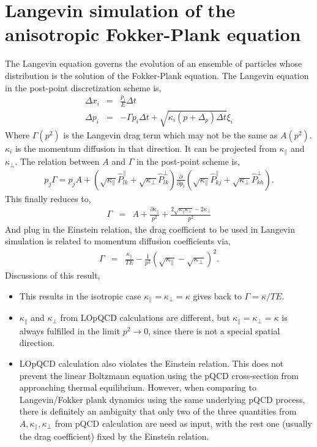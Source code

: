 \documentclass[10pt,a4paper]{article}
\newcommand{\ppl}{\frac{\partial}{\partial p_l}}
\newcommand{\Kpara}{\kappa_{\|}}
\newcommand{\Kperp}{\kappa_{\perp}}
\newcommand{\Ppara}{\hat{P}^{\|}}
\newcommand{\Pperp}{\hat{P}^{\perp}}
\begin{document}
\section{Langevin simulation of the anisotropic Fokker-Plank equation}
The Langevin equation governs the evolution of an ensemble of particles whose distribution is the solution of the Fokker-Plank equation.
The Langevin equation in the post-point discretization scheme is,
\begin{eqnarray}
\Delta x_i &=& \frac{p_i}{E} \Delta t	\\
\Delta p_i &=& -\Gamma p_i \Delta t + \sqrt{\kappa_i(p+\Delta_p)\Delta t} \xi_i
\end{eqnarray}
Where $\Gamma(p^2)$ is the Langevin drag term which may not be the same as $A(p^2)$. 
$\kappa_i$ is the momentum diffusion in that direction. 
It can be projected from $\Kpara$ and $\Kperp$.
The relation between $A$ and $\Gamma$ in the post-point scheme is,
\begin{eqnarray}
p_j \Gamma  = p_jA + \left(\sqrt{\Kpara}\Ppara_{lk} + \sqrt{\Kperp}\Pperp_{lk}\right) \ppl \left( \sqrt{\Kpara}\Ppara_{kj} + \sqrt{\Kperp}\Pperp_{kh} \right).
\end{eqnarray}
This finally reduces to,
\begin{eqnarray}
\Gamma &=& A + \frac{\partial \Kpara}{p^2} + \frac{2\sqrt{\Kpara\Kperp} - 2\Kperp}{p^2}
\end{eqnarray}
And plug in the Einstein relation, the drag coefficient to be used in Langevin simulation is related to momentum diffusion coefficients via,
\begin{eqnarray}
\Gamma &=& \frac{\Kpara}{TE} - \frac{1}{p^2}\left( \sqrt{\Kpara} - \sqrt{\Kperp} \right)^2.
\end{eqnarray}
Discussions of this result,
\begin{itemize}
\item This results in the isotropic case $\Kpara=\Kperp=\kappa$ gives back to $\Gamma = \kappa/TE$.
\item $\Kpara$ and $\Kperp$ from LOpQCD calculations are different, but $\Kpara=\Kperp=\kappa$ is always fulfilled in the limit $p^2 \rightarrow 0$, since there is not a special spatial direction.
\item LOpQCD calculation also violates the Einstein relation. 
This does not prevent the linear Boltzmann equation using the pQCD cross-section from approaching thermal equilibrium. 
However, when comparing to Langevin/Fokker plank dynamics using the same underlying pQCD process, there is definitely an ambiguity that only two of the three quantities from  $A, \Kpara, \Kperp$ from pQCD calculation are need as input, with the rest one (usually the drag coefficient) fixed by the Einstein relation. 
\end{itemize}
\end{document}
